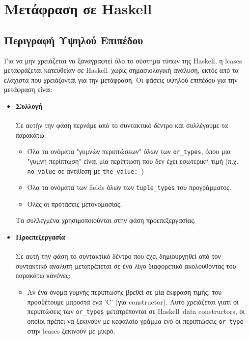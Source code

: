 \documentclass[diploma]{softlab-thesis}
\def\H{Haskell}
\begin{document}
\chapter{Μετάφραση σε \H}

\section{Περιγραφή Υψηλού Επιπέδου}

Για να μην χρειάζεται να ξαναγραφτεί όλο το σύστημα τύπων της \H, η lcases
μεταφράζεται κατευθείαν σε \H\ χωρίς σημασιολογική ανάλυση, εκτός από τα
ελάχιστα που χρειάζονται για την μετάφραση. Οι φάσεις υψηλού επιπέδου για
την μετάφραση είναι:

\begin{itemize}
\item
\textbf{Συλλογή}\\\\
Σε αυτήν την φάση περνάμε από το συντακτικό δέντρο και συλλέγουμε τα παρακάτω:

\begin{itemize}
\item
Όλα τα ονόματα "γυμνών περιπτώσεων" όλων των \verb|or_types|, όπου μια "γυμνή
περίπτωση" είναι μία περίπτωση που δεν έχει εσωτερική τιμή
(π.χ. \verb|no_value| σε αντίθεση με \verb|the_value:_|)

\item
Όλα τα ονόματα των fields όλων των \verb|tuple_types| του προγράμματος.

\item
Όλες οι προτάσεις μετονομασίας.

\end{itemize}

Τα συλλεγμένα χρησιμοποιούνται στην φάση προεπεξεργασίας.

\item
\textbf{Προεπεξεργασία}\\\\
Σε αυτή την φάση το συντακτικό δέντρο που έχει δημιουργηθεί από τον συντακτικό
αναλυτή μετατρέπεται σε ένα λίγο διαφορετικό ακολουθόντας του παρακάτω κανόνες:

\begin{itemize}
\item
Αν ένα όνομα γυμνής περίπτωσης βρεθεί σε μία έκφραση τιμής, του προσθέτουμε
μπροστά ένα 'C' (για constructor). Αυτό χρειάζεται γιατί οι περιπτώσεις των
\verb|or_types| μετατρέπονται σε \H\ data constructors, οι οποίοι πρέπει
να ξεκινούν με κεφαλαίο γράμμα ενό οι περιπτώσεις \verb|or_type| στην lcases
ξεκινούν με μικρό.


\end{itemize}
\end{itemize}
\end{document}
